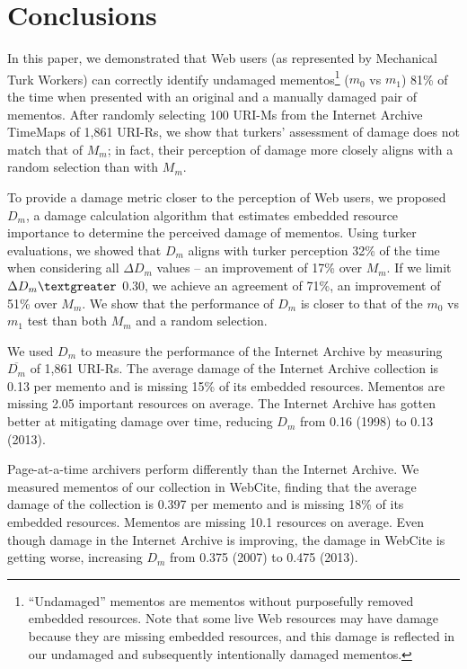

\section{Conclusions}
\label{conclusion}
In this paper, we demonstrated that Web users (as represented by Mechanical Turk Workers) can correctly identify undamaged mementos\footnote{``Undamaged'' mementos are mementos without purposefully removed embedded resources. Note that some live Web resources may have damage because they are missing embedded resources, and this damage is reflected in our undamaged and subsequently intentionally damaged mementos.} ($m_0$ vs $m_1$) 81\% of the time when presented with an original and a manually damaged pair of mementos. After randomly selecting 100 URI-Ms from the Internet Archive TimeMaps of 1,861 URI-Rs, we show that turkers' assessment of damage does not match that of $M_m$; in fact, their perception of damage more closely aligns with a random selection than with $M_m$. 

To provide a damage metric closer to the perception of Web users, we proposed $D_m$, a damage calculation algorithm that estimates embedded resource importance to determine the perceived damage of mementos. Using turker evaluations, we showed that $D_m$ aligns with turker perception 32\% of the time when considering all {$\Delta D_m$} values -- an improvement of 17\% over $M_m$. If we limit {$\Delta D_m \textgreater$} 0.30, we achieve an agreement of 71\%, an improvement of 51\% over $M_m$. We show that the performance of $D_m$ is closer to that of the $m_0$ vs $m_1$ test than both $M_m$ and a random selection.

We used $D_m$ to measure the performance of the Internet Archive by measuring $\overline{D_m}$ of 1,861 URI-Rs. The average damage of the Internet Archive collection is 0.13 per memento and is missing 15\% of its embedded resources. Mementos are missing 2.05 important resources on average. The Internet Archive has gotten better at mitigating damage over time, reducing $D_m$ from 0.16 (1998) to 0.13 (2013). 

Page-at-a-time archivers perform differently than the Internet Archive. We measured mementos of our collection in WebCite, finding that the average damage of the collection is 0.397 per memento and is missing 18\% of its embedded resources. Mementos are missing 10.1 resources on average. Even though damage in the Internet Archive is improving, the damage in WebCite is getting worse, increasing $D_m$ from 0.375 (2007) to 0.475 (2013). 

